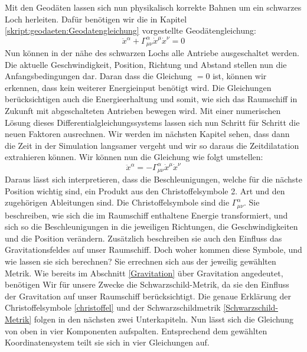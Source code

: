 \begin{refsection}
	Mit den Geodäten lassen sich nun physikalisch korrekte Bahnen um ein schwarzes Loch herleiten. Dafür benötigen wir die in Kapitel \ref{skript:geodaeten:Geodatengleichung}
	vorgestellte Geodätengleichung:	
	\begin{equation}
	\ddot{x}^{\alpha} + \Gamma^{\alpha}_{\mu\nu}\dot{x}^{\mu}\dot{x}^{\nu} = 0
	\end{equation}
	Nun können in der nähe des schwarzen Lochs alle Antriebe ausgeschaltet werden. Die aktuelle Geschwindigkeit, Position, Richtung und Abstand stellen nun die Anfangsbedingungen dar. Daran dass die Gleichung $=0$ ist, können wir erkennen, dass kein weiterer Energieinput benötigt wird. Die Gleichungen berücksichtigen auch die Energieerhaltung und somit, wie sich das Raumschiff in Zukunft mit abgeschalteten Antrieben bewegen wird. Mit einer numerischen Lösung dieses Differentialgleichungssystems lassen sich nun Schritt für Schritt die neuen Faktoren ausrechnen. Wir werden im nächsten Kapitel sehen, dass dann die Zeit in der Simulation langsamer vergeht und wir so daraus die Zeitdilatation extrahieren können.
	Wir k\"onnen nun die Gleichung wie folgt umstellen:	
	\begin{equation}
	\ddot{x}^{\alpha} = -\Gamma^{\alpha}_{\mu\nu}\dot{x}^{\mu}\dot{x}^{\nu}
	\end{equation}
	Daraus lässt sich interpretieren, dass die Beschleunigungen, welche für die nächste Position wichtig sind, ein Produkt aus den Christoffelsymbole 2. Art und den zugehörigen Ableitungen sind. Die Christoffelsymbole sind die $\Gamma^{\alpha}_{\mu\nu}$. Sie beschreiben, wie sich die im Raumschiff enthaltene Energie transformiert, und sich so die Beschleunigungen in die jeweiligen Richtungen, die Geschwindigkeiten und die Position verändern. Zusätzlich beschreiben sie auch den Einfluss das Gravitationsfeldes auf unser Raumschiff.
	Doch woher kommen diese Symbole, und wie lassen sie sich berechnen?
	Sie errechnen sich aus der jeweilig gewählten Metrik. Wie bereits im Abschnitt \ref{Gravitation} über Gravitation angedeutet, benötigen Wir für unsere Zwecke die Schwarzschild-Metrik, da sie den Einfluss der Gravitation auf unser Raumschiff berücksichtigt. Die genaue Erklärung der Christoffelsymbole \ref{christoffel} und der Schwarzschildmetrik \ref{Schwarzschild-Metrik} folgen in den nächsten zwei Unterkapiteln.
	Nun lässt sich die Gleichung von oben in vier Komponenten aufspalten.
	Entsprechend dem gewählten Koordinatensystem teilt sie sich in vier Gleichungen auf.
	\begin{align*}

\end{align*}
\end{refsection}
